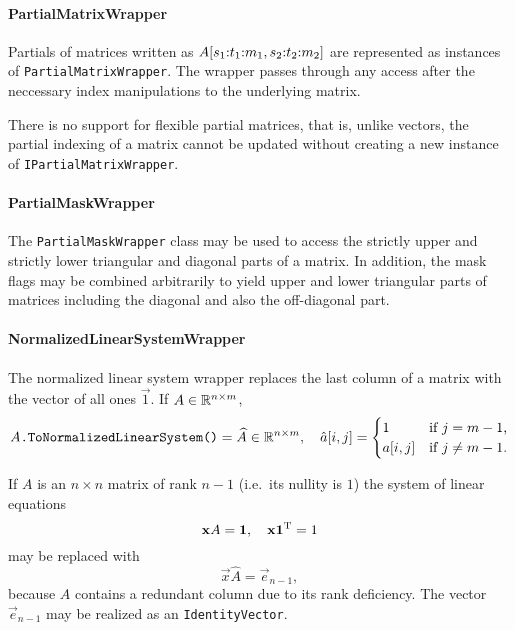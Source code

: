 \paragraph{PartialMatrixWrapper}

Partials of matrices written as
$A[s_1{:}t_1{:}m_1, s_2{:}t_2{:}m_2]$ are represented as
instances of \texttt{PartialMatrixWrapper}. The wrapper passes through
any access after the neccessary index manipulations to the underlying
matrix.

There is no support for flexible partial matrices, that is, unlike
vectors, the partial indexing of a matrix cannot be updated without
creating a new instance of \texttt{IPartialMatrixWrapper}.

\paragraph{PartialMaskWrapper}

The \texttt{PartialMaskWrapper} class may be used to access the
strictly upper and strictly lower triangular and diagonal parts of a
matrix. In addition, the mask flags may be combined arbitrarily to
yield upper and lower triangular parts of matrices including the
diagonal and also the off-diagonal part.

\paragraph{NormalizedLinearSystemWrapper}

The normalized linear system wrapper replaces the last column of a
matrix with the vector of all ones $\vec{1}$. If $A \in \mathbb{R}^{n \times
  m}$,
\begin{equation}
  \texttt{$A$.ToNormalizedLinearSystem()} = \widehat{A} \in \mathbb{R}^{n \times
    m}, \quad \hat{a}[i, j] =
  \begin{cases}
    1 & \text{if $j = m - 1$,} \\
    a[i, j] & \text{if $j \ne m - 1$.}
  \end{cases}
\end{equation}

If $A$ is an $n \times n$ matrix of rank $n  - 1$ (i.e.~its nullity is
$1$) the system of linear equations
\begin{equation}
  \bm{\mathrm{x}} A = \bm{\mathrm{1}}, \quad \bm{\mathrm{x}} \bm{\mathrm{1}}^{\mathrm{T}} = 1
\end{equation}
may be replaced with
\begin{equation}
  \vec{x} \widehat{A} = \vec{e}_{n - 1},
\end{equation}
because $A$ contains a redundant column due to its rank
deficiency. The vector $\vec{e}_{n - 1}$ may be realized as an
\texttt{IdentityVector}.

